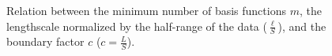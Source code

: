 \documentclass[]{interact}
\theoremstyle{plain}%
\theoremstyle{definition}
\theoremstyle{remark}
\begin{document}
\begin{figure}[H]
\centering
{}
\caption{Relation between the minimum number of basis functions $m$, the lengthscale normalized by the half-range of the data ($\frac{\ell}{S}$), and the boundary factor $c$ ($c = \frac{L}{S}$).}
  \label{fig3_lscale_vs_J_vs_c_part1}
\end{figure}
\end{document}

